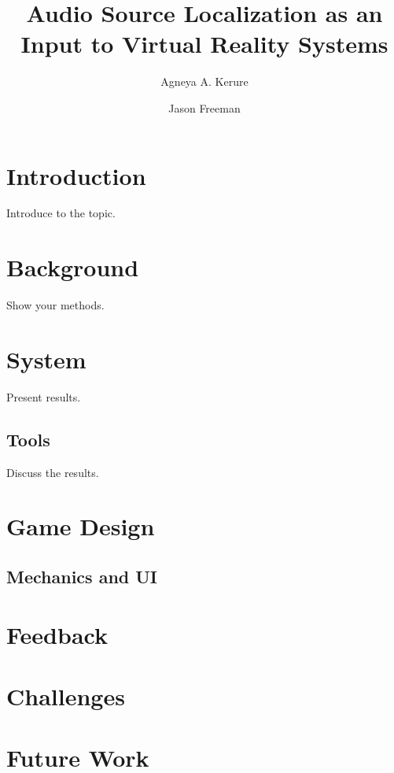 \documentclass[convention]{aesconf}
\title{Audio Source Localization as an Input to Virtual Reality Systems}
\author[1]{Agneya A. Kerure}
\author[1]{Jason Freeman}
\affil[1]{Georgia Institute of Technology}
\begin{document}

\section{Introduction}

Introduce to the topic.

\section{Background}

Show your methods.

\section{System}  

Present results.

\subsection{Tools} 

Discuss the results.

\section{Game Design} 

\subsection{Mechanics and UI} 

\section{Feedback} 

\section{Challenges} 

\section{Future Work} 
\end{document}
